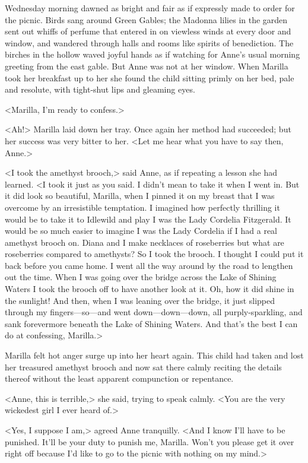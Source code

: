 Wednesday morning dawned as bright and fair as if expressly made to order for the picnic. Birds sang around Green Gables; the Madonna lilies in the garden sent out whiffs of perfume that entered in on viewless winds at every door and window, and wandered through halls and rooms like spirits of benediction. The birches in the hollow waved joyful hands as if watching for Anne's usual morning greeting from the east gable. But Anne was not at her window. When Marilla took her breakfast up to her she found the child sitting primly on her bed, pale and resolute, with tight-shut lips and gleaming eyes.

<Marilla, I'm ready to confess.>

<Ah!> Marilla laid down her tray. Once again her method had succeeded; but her success was very bitter to her. <Let me hear what you have to say then, Anne.>

<I took the amethyst brooch,> said Anne, as if repeating a lesson she had learned. <I took it just as you said. I didn't mean to take it when I went in. But it did look so beautiful, Marilla, when I pinned it on my breast that I was overcome by an irresistible temptation. I imagined how perfectly thrilling it would be to take it to Idlewild and play I was the Lady Cordelia Fitzgerald. It would be so much easier to imagine I was the Lady Cordelia if I had a real amethyst brooch on. Diana and I make necklaces of roseberries but what are roseberries compared to amethysts? So I took the brooch. I thought I could put it back before you came home. I went all the way around by the road to lengthen out the time. When I was going over the bridge across the Lake of Shining Waters I took the brooch off to have another look at it. Oh, how it did shine in the sunlight! And then, when I was leaning over the bridge, it just slipped through my fingers—so—and went down—down—down, all purply-sparkling, and sank forevermore beneath the Lake of Shining Waters. And that's the best I can do at confessing, Marilla.>

Marilla felt hot anger surge up into her heart again. This child had taken and lost her treasured amethyst brooch and now sat there calmly reciting the details thereof without the least apparent compunction or repentance.

<Anne, this is terrible,> she said, trying to speak calmly. <You are the very wickedest girl I ever heard of.>

<Yes, I suppose I am,> agreed Anne tranquilly. <And I know I'll have to be punished. It'll be your duty to punish me, Marilla. Won't you please get it over right off because I'd like to go to the picnic with nothing on my mind.>

